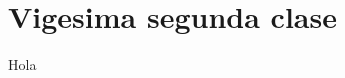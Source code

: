 \documentclass[../main.tex]{subfiles}
\begin{document}
\section{Vigesima segunda clase}
Hola
\end{document}
